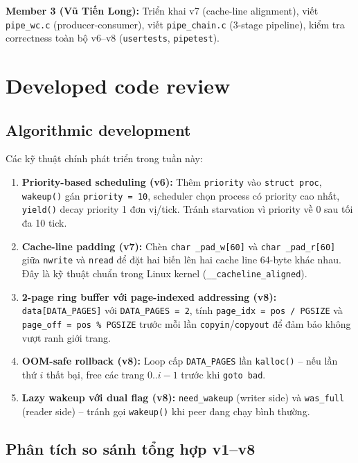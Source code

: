 \documentclass[11pt,a4paper]{article}
\begin{document}
\textbf{Member 3 (Vũ Tiến Long):} Triển khai v7 (cache-line alignment), viết \texttt{pipe\_wc.c} (producer-consumer), viết \texttt{pipe\_chain.c} (3-stage pipeline), kiểm tra correctness toàn bộ v6--v8 (\texttt{usertests}, \texttt{pipetest}).

\section{Developed code review}

\subsection{Algorithmic development}

Các kỹ thuật chính phát triển trong tuần này:

\begin{enumerate}
  \item \textbf{Priority-based scheduling (v6):} Thêm \texttt{priority} vào \texttt{struct proc}, \texttt{wakeup()} gán \texttt{priority = 10}, scheduler chọn process có priority cao nhất, \texttt{yield()} decay priority 1 đơn vị/tick. Tránh starvation vì priority về 0 sau tối đa 10 tick.
  \item \textbf{Cache-line padding (v7):} Chèn \texttt{char \_pad\_w[60]} và \texttt{char \_pad\_r[60]} giữa \texttt{nwrite} và \texttt{nread} để đặt hai biến lên hai cache line 64-byte khác nhau. Đây là kỹ thuật chuẩn trong Linux kernel (\texttt{\_\_cacheline\_aligned}).
  \item \textbf{2-page ring buffer với page-indexed addressing (v8):} \texttt{data[DATA\_PAGES]} với \texttt{DATA\_PAGES = 2}, tính \texttt{page\_idx = pos / PGSIZE} và \texttt{page\_off = pos \% PGSIZE} trước mỗi lần \texttt{copyin}/\texttt{copyout} để đảm bảo không vượt ranh giới trang.
  \item \textbf{OOM-safe rollback (v8):} Loop cấp \texttt{DATA\_PAGES} lần \texttt{kalloc()} -- nếu lần thứ $i$ thất bại, free các trang $0..i-1$ trước khi \texttt{goto bad}.
  \item \textbf{Lazy wakeup với dual flag (v8):} \texttt{need\_wakeup} (writer side) và \texttt{was\_full} (reader side) -- tránh gọi \texttt{wakeup()} khi peer đang chạy bình thường.
\end{enumerate}

\subsection{Phân tích so sánh tổng hợp v1--v8}
\end{document}
